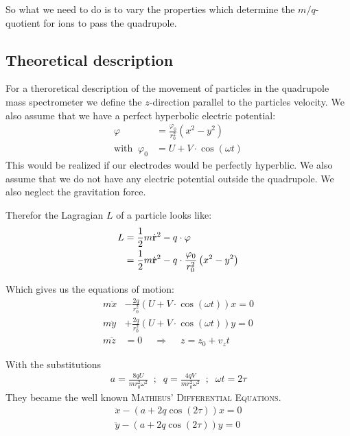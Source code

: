 \documentclass[a4paper, parskip=half]{scrartcl}
\begin{document}
So what we need to do is to vary the properties which determine the $m/q$-quotient for ions to pass the quadrupole.

\subsection{Theoretical description}
For a theroretical description of the movement of particles in the quadrupole mass spectrometer we define the $z$-direction parallel to the particles velocity. We also assume that we have a perfect hyperbolic electric potential:
\begin{align}
\varphi &= \frac{\varphi_0}{r_0^2} \left(x^2 - y^2 \right)\\
\text{with}\;\;\varphi_0 &= U + V \cdot \cos\left(\omega t\right)
\end{align} 
This would be realized if our electrodes would be perfectly hyperblic. We also assume that we do not have any electric potential outside the quadrupole. We also neglect the gravitation force.


Therefor the Lagragian $L$ of a particle looks like:
\begin{align}
L &= \frac{1}{2}m\dot{\bf r}^2 - q \cdot \varphi \\
&= \frac{1}{2}m \dot{\bf r}^2 - q \cdot \frac{\varphi_0}{r_0^2}\left(x^2 - y^2 \right)
\end{align}

Which gives us the equations of motion:
\begin{align}
m\ddot{x} &- \frac{2q}{r_0^2} \left( U + V \cdot \cos\left(\omega t\right) \right ) x = 0 \\
m\ddot{y} &+ \frac{2q}{r_0^2} \left( U + V \cdot \cos\left(\omega t\right) \right ) y = 0 \\
m\ddot{z} &= 0 \;\;\,\,\,\, \Rightarrow \;\;\,\,\,\, z = z_0 + v_zt
\end{align}

With the substitutions
\begin{align}
a = \frac{8qU}{mr_0^2\omega^2} \;\; ; \;\; q = \frac{4qV}{mr_0^2\omega^2} \;\; ; \;\; \omega t = 2 \tau
\end{align}
They became the well known \textsc{Mathieus’ Differential Equations}.
\begin{align}
\ddot{x} - \left(a + 2q\cos\left(2\tau\right)\right) x \label{mat1} = 0\\
\ddot{y} - \left(a + 2q\cos\left(2\tau\right)\right) y \label{mat2} = 0
\end{align}
\end{document}
